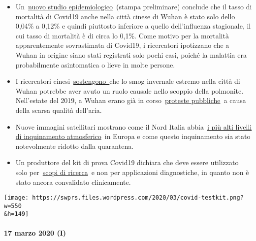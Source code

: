 \begin{itemize}
\tightlist
\item
  Un~\href{https://www.medrxiv.org/content/10.1101/2020.02.12.20022434v2}{nuovo
  studio epidemiologico}~(stampa preliminare) conclude che il tasso di
  mortalità di Covid19 anche nella città cinese di Wuhan è stato solo
  dello 0,04\% a 0,12\% e quindi piuttosto inferiore a quello
  dell'influenza stagionale, il cui tasso di mortalità è di circa lo
  0,1\%. Come motivo per la mortalità apparentemente sovrastimata di
  Covid19, i ricercatori ipotizzano che a Wuhan in origine siano stati
  registrati solo pochi casi, poiché la malattia era probabilmente
  asintomatica o lieve in molte persone.
\item
  I ricercatori
  cinesi~\href{https://www.eurasiareview.com/01022020-polluted-air-could-be-an-important-cause-of-wuhan-pneumonia-oped/}{sostengono~}che
  lo smog invernale estremo nella città di Wuhan potrebbe aver avuto un
  ruolo causale nello scoppio della polmonite. Nell'estate del 2019, a
  Wuhan erano già in
  corso~\href{https://www.cnn.com/2019/07/10/asia/china-wuhan-pollution-problems-intl-hnk/index.html}{proteste
  pubbliche}~a causa della scarsa qualità dell'aria.
\item
  Nuove immagini satellitari mostrano come il Nord Italia
  abbia~\href{https://twitter.com/esa/status/1238480433047916545}{i più
  alti livelli di inquinamento atmosferico}~in Europa e come questo
  inquinamento sia stato notevolmente ridotto dalla quarantena.
\item
  Un produttore del kit di prova Covid19 dichiara che deve essere
  utilizzato solo
  per~\href{https://www.creative-diagnostics.com/sars-cov-2-coronavirus-multiplex-rt-qpcr-kit-277854-457.htm}{scopi
  di ricerca}~e non per applicazioni diagnostiche, in quanto non è stato
  ancora convalidato clinicamente.
\end{itemize}

\texttt{[image: https://swprs.files.wordpress.com/2020/03/covid-testkit.png?w=550\\\&h=149]}

\hypertarget{17-marzo-2020-i}{%
\paragraph{17 marzo 2020 (I)}\label{17-marzo-2020-i}}

